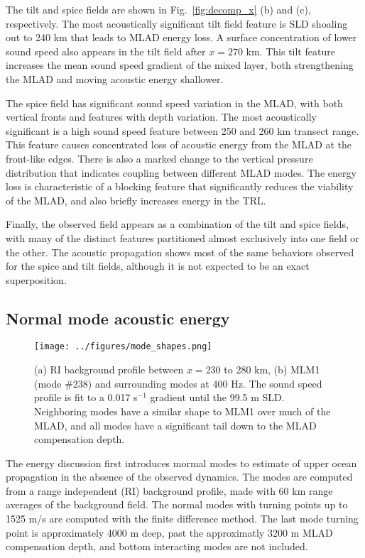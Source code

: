 \documentclass[preprint,NumberedRefs]{JASA}
\begin{document}
The tilt and spice fields are shown in Fig.~\ref{fig:decomp_x} (b) and (c), respectively. The most acoustically significant tilt field feature is SLD shoaling out to 240 km that leads to MLAD energy loss. A surface concentration of lower sound speed also appears in the tilt field after $x=270$ km. This tilt feature increases the mean sound speed gradient of the mixed layer, both strengthening the MLAD and moving acoustic energy shallower.

The spice field has significant sound speed variation in the MLAD, with both vertical fronts and features with depth variation. The most acoustically significant is a high sound speed feature between 250 and 260 km transect range. This feature causes concentrated loss of acoustic energy from the MLAD at the front-like edges. There is also a marked change to the vertical pressure distribution that indicates coupling between different MLAD modes. The energy loss is characteristic of a blocking feature\cite{colosi2020observations} that significantly reduces the viability of the MLAD, and also briefly increases energy in the TRL.

Finally, the observed field appears as a combination of the tilt and spice fields, with many of the distinct features partitioned almost exclusively into one field or the other. The acoustic propagation shows most of the same behaviors observed for the spice and tilt fields, although it is not expected to be an exact superposition.

\subsection{Normal mode acoustic energy}
\begin{figure}
\texttt{[image: ../figures/mode\_shapes.png]}
    \caption{\label{fig:bg_modes}{(a) RI background profile between $x=$230 to 280 km, (b) MLM1 (mode \#238) and surrounding modes at 400 Hz. The sound speed profile is fit to a 0.017 s$^{-1}$ gradient until the 99.5 m SLD. Neighboring modes have a similar shape to MLM1 over much of the MLAD, and all modes have a significant tail down to the MLAD compensation depth.}}
\end{figure}

The energy discussion first introduces mormal modes to estimate of upper ocean propagation in the absence of the observed dynamics. The modes are computed from a range independent (RI) background profile, made with 60 km range averages of the background field. The normal modes with turning points up to 1525 m/s are computed with the finite difference method.\cite{jensen2011computational} The last mode turning point is approximately 4000 m deep, past the approximatly 3200 m MLAD compensation depth, and bottom interacting modes are not included.
\end{document}
